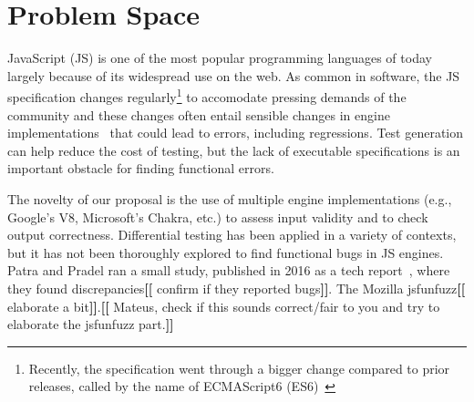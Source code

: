 \documentclass[11pt]{article}
\newcommand{\eg}{e.g.}
\newcommand{\Fix}[1]{\textbf{[[}{\color{red} #1}\textbf{]]}}
\newcommand{\Mar}[1]{\textbf{[[}{\color{blue} #1}\textbf{]]}}
\newcommand{\Comment}[1]{}
\begin{document}
\section{Problem Space}



JavaScript (JS) is one of the most popular programming languages of
today~\cite{business-insider,stackify} largely because of its
widespread use on the web. As common in software, the JS specification
changes regularly\footnote{Recently, the specification went through a
  bigger change compared to prior releases, called by the name of
  ECMAScript6 (ES6)~\cite{es6-features}} to accomodate pressing
demands of the community and these changes often entail sensible
changes in engine implementations~\cite{kangax} that could lead to
errors, including regressions.  Test generation can help reduce the
cost of testing, but the lack of executable specifications is an
important obstacle for finding functional errors.

\begin{center}
\end{center}

The novelty of our proposal is the use of multiple engine
implementations (\eg{}, Google's V8, Microsoft's Chakra, etc.) to
assess input validity and to check output correctness. Differential
testing\cite{McKeeman98differentialtesting} has been applied in a
variety of
contexts\cite{Brumley-etal-ss07,Yang-etal-pldi11,Chen-etal-fse2015,Argyros-etla-ccs16,Chen-etal-pldi16,petsios-etal-sp2017,SivakornAPKJ17},
but it has not been thoroughly explored to find functional bugs in JS
engines. Patra and Pradel ran a small study, published in 2016 as
a tech report~\cite{patra2016learning}, where they found
discrepancies\Fix{confirm if they reported bugs}. The Mozilla
jsfunfuzz\Fix{elaborate a bit}.\Mar{Mateus, check if this sounds
  correct/fair to you and try to elaborate the jsfunfuzz part.}
\end{document}
